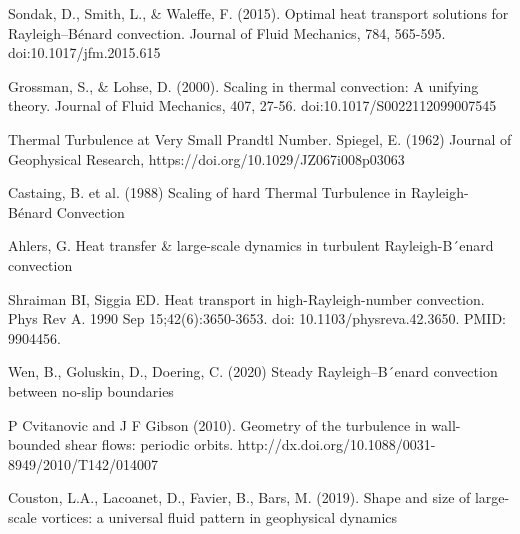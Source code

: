 \documentclass[reprint,amsmath,amssymb,aps]{revtex4-1}
\begin{document}
\begin{thebibliography}{99}
 Sondak, D., Smith, L., \& Waleffe, F. (2015). Optimal heat transport solutions for Rayleigh–Bénard convection. Journal of Fluid Mechanics, 784, 565-595. doi:10.1017/jfm.2015.615

 Grossman, S., \& Lohse, D. (2000). Scaling in thermal convection: A unifying theory. Journal of Fluid Mechanics, 407, 27-56. doi:10.1017/S0022112099007545

 Thermal Turbulence at Very Small Prandtl Number. Spiegel, E. (1962) Journal of Geophysical Research, https://doi.org/10.1029/JZ067i008p03063

 Castaing, B. et al. (1988) Scaling of hard Thermal Turbulence in Rayleigh-B\'enard Convection

 Ahlers, G. Heat transfer \& large-scale dynamics in turbulent Rayleigh-B´enard convection

 Shraiman BI, Siggia ED. Heat transport in high-Rayleigh-number convection. Phys Rev A. 1990 Sep 15;42(6):3650-3653. doi: 10.1103/physreva.42.3650. PMID: 9904456.

 Wen, B., Goluskin, D., Doering, C. (2020) Steady Rayleigh–B´enard convection between no-slip boundaries

 P Cvitanovic and J F Gibson (2010). Geometry of the turbulence in wall-bounded shear flows: periodic orbits. http://dx.doi.org/10.1088/0031-8949/2010/T142/014007

 Couston, L.A., Lacoanet, D., Favier, B., Bars, M. (2019). Shape and size of large-scale vortices: a universal fluid pattern in geophysical dynamics   

\end{thebibliography}

% 
% 
\end{document}
